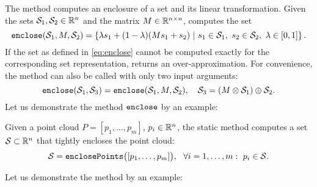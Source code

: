 The method  computes an enclosure of a set and its linear transformation. Given the sets $\mathcal{S}_1,\mathcal{S}_2 \in \mathbb{R}^n$ and the matrix $M \in \mathbb{R}^{n \times n}$,  computes the set
\begin{equation}
	{\normalfont \texttt{enclose}}(\mathcal{S}_1,M,\mathcal{S}_2) = \left \{ \lambda s_1 + (1-\lambda) (Ms_1 +s_2) ~|~ s_1 \in \mathcal{S}_1,~s_2 \in \mathcal{S}_2,~\lambda \in [0,1] \right\}.
	\label{eq:enclose}
\end{equation}
If the set as defined in \eqref{eq:enclose} cannot be computed exactly for the corresponding set representation,  returns an over-approximation. For convenience, the method can also be called with only two input arguments:
\begin{equation*}
	{\normalfont \texttt{enclose}}(\mathcal{S}_1,\mathcal{S}_3) = {\normalfont \texttt{enclose}}(\mathcal{S}_1,M,\mathcal{S}_2), ~~~ \mathcal{S}_3 = (M \otimes \mathcal{S}_1) \oplus \mathcal{S}_2.
\end{equation*}
Let us demonstrate the method ${\normalfont \texttt{enclose}}$ by an example:

\begin{center}
\begin{minipage}[t]{0.37\textwidth}
	\vspace{10pt}
	\footnotesize
	
\end{minipage}
\begin{minipage}[t]{0.6\textwidth}
	\vspace{0pt}
	\centering
\end{minipage}
\end{center}

\vspace{1cm}


Given a point cloud $P = [p_1,\dots,p_m]$, $p_i \in \mathbb{R}^n$, the static method  computes a set $\mathcal{S} \subset \mathbb{R}^n$ that tightly encloses the point cloud:
\begin{equation*}
	\mathcal{S} = {\normalfont \texttt{enclosePoints}}\big([p_1,\dots,p_m]\big), ~~ \forall i = 1,\dots,m: ~ p_i \in \mathcal{S}.
\end{equation*}

Let us demonstrate the method  by an example:

\begin{center}
\begin{minipage}[t]{0.50\textwidth}
	\vspace{10pt}
	\footnotesize
	
\end{minipage}
\begin{minipage}[t]{0.3\textwidth}
	\vspace{0pt}
	\centering
\end{minipage}
\end{center}

